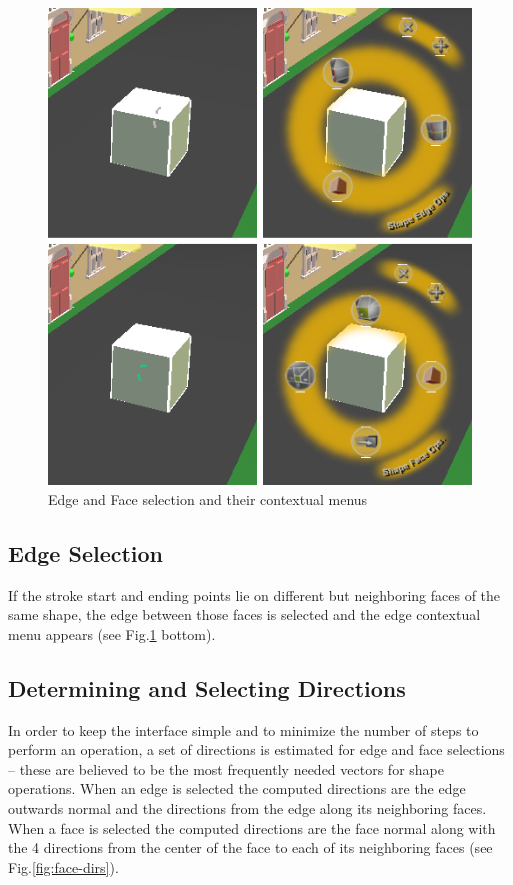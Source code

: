 \begin{figure}[ht]
	\centering
		\includegraphics[scale=0.5]{gfx/face-edge-selection-imp.png}
	\caption{Edge and Face selection and their contextual menus}
	\label{fig:face-edge-selection-imp}
\end{figure}



\subsection{Edge Selection}

If the stroke start and ending points lie on different but neighboring faces of the same shape, the edge between
those faces is selected and the edge contextual menu appears
(see Fig.\ref{fig:face-edge-selection-imp} bottom).


\subsection{Determining and Selecting Directions}

In order to keep the interface simple and to minimize the number of steps to perform an operation, a set of directions
is estimated for edge and face selections -- these are believed to be the most frequently needed vectors for shape operations.
When an edge is selected the computed directions are the edge outwards normal and the directions from the edge along its neighboring faces.
When a face is selected the computed directions are the face normal along with the 4 directions from the center of the face
to each of its neighboring faces (see Fig.\ref{fig:face-dirs}).

